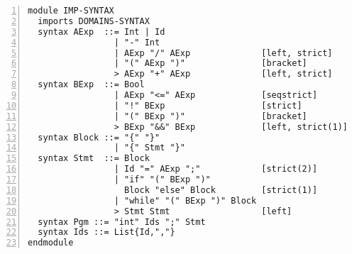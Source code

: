 \begin{lstlisting}[float=ht,
  frame=single,
  style=ksty,
  language=k,
  numbers=left,
  numbersep=5pt,
  caption={Imp Syntax in $\K$},
  label={lst:imp-syntax},
  xleftmargin=3ex
]
module IMP-SYNTAX                                               @\label{lstline:imp-module-start}@
  imports DOMAINS-SYNTAX                                        @\label{lstline:imp-syntax-import}@
  syntax AExp  ::= Int | Id                                     @\label{lstline:imp-aexp-start}@
                 | "-" Int
                 | AExp "/" AExp              [left, strict]    @\label{lstline:imp-aexp-div}@
                 | "(" AExp ")"               [bracket]
                 > AExp "+" AExp              [left, strict]    @\label{lstline:imp-aexp-end}@
  syntax BExp  ::= Bool
                 | AExp "<=" AExp             [seqstrict]
                 | "!" BExp                   [strict]
                 | "(" BExp ")"               [bracket]
                 > BExp "&&" BExp             [left, strict(1)] @\label{lstline:imp-bexp-and}@
  syntax Block ::= "{" "}"
                 | "{" Stmt "}"
  syntax Stmt  ::= Block                                        @\label{lstline:imp-stmt-block}@
                 | Id "=" AExp ";"            [strict(2)]       @\label{lstline:imp-stmt-assgn}@
                 | "if" "(" BExp ")"
                   Block "else" Block         [strict(1)]
                 | "while" "(" BExp ")" Block                   @\label{lstline:imp-stmt-while}@
                 > Stmt Stmt                  [left]            @\label{lstline:imp-stmt-comp}@
  syntax Pgm ::= "int" Ids ";" Stmt                             @\label{lstline:imp-pgm}@
  syntax Ids ::= List{Id,","}                                   @\label{lstline:imp-ids}@
endmodule                                                       @\label{lstline:imp-module-end}@
\end{lstlisting}

